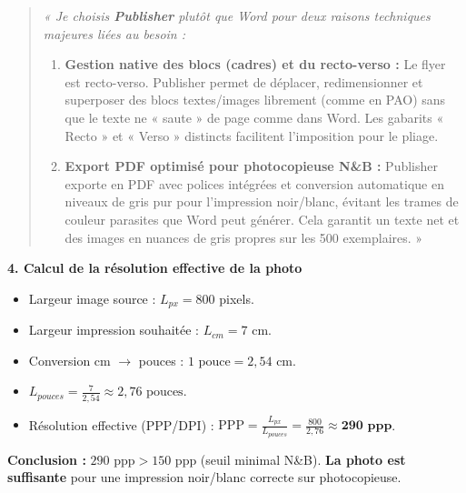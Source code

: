 \documentclass[11pt]{article}
\begin{document}
\begin{exoresolu}
\begin{quote}
\textit{« Je choisis \textbf{Publisher} plutôt que Word pour deux raisons techniques majeures liées au besoin :}
\begin{enumerate}
    \item \textbf{Gestion native des blocs (cadres) et du recto-verso :} Le flyer est recto-verso. Publisher permet de déplacer, redimensionner et superposer des blocs textes/images librement (comme en PAO) sans que le texte ne « saute » de page comme dans Word. Les gabarits « Recto » et « Verso » distincts facilitent l'imposition pour le pliage.
    \item \textbf{Export PDF optimisé pour photocopieuse N\&B :} Publisher exporte en PDF avec polices intégrées et conversion automatique en niveaux de gris pur pour l'impression noir/blanc, évitant les trames de couleur parasites que Word peut générer. Cela garantit un texte net et des images en nuances de gris propres sur les 500 exemplaires. »
\end{enumerate}
\end{quote}

\textbf{4. Calcul de la résolution effective de la photo}

\begin{itemize}
    \item Largeur image source : $L_{px} = 800$ pixels.
    \item Largeur impression souhaitée : $L_{cm} = 7$ cm.
    \item Conversion cm $\rightarrow$ pouces : $1 \text{ pouce} = 2,54 \text{ cm}$.
    \item $L_{pouces} = \frac{7}{2,54} \approx 2,76 \text{ pouces}$.
    \item Résolution effective (PPP/DPI) : $\text{PPP} = \frac{L_{px}}{L_{pouces}} = \frac{800}{2,76} \approx \mathbf{290 \text{ ppp}}$.
\end{itemize}

\textbf{Conclusion :} $290 \text{ ppp} > 150 \text{ ppp}$ (seuil minimal N\&B). \textbf{La photo est suffisante} pour une impression noir/blanc correcte sur photocopieuse.
\end{exoresolu}
\end{document}

